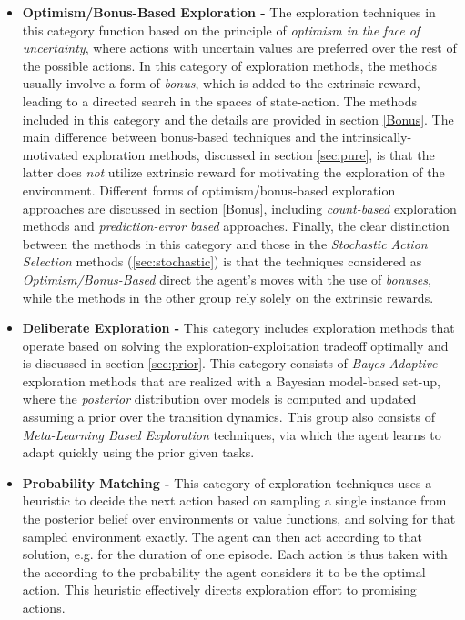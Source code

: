 \begin{itemize}
	\item \textbf{Optimism/Bonus-Based Exploration -} The exploration techniques in this category function based on the principle of \emph{optimism in the face of uncertainty}, where actions with uncertain values are preferred over the rest of the possible actions. In this category of exploration methods, the methods usually involve a form of \emph{bonus}, which is added to the extrinsic reward, leading to a directed search in the spaces of state-action. The methods included in this category and the details are provided in section \ref{Bonus}. The main difference between bonus-based techniques and the intrinsically-motivated exploration methods, discussed in section \ref{sec:pure}, is that the latter does \emph{not} utilize extrinsic reward for motivating the exploration of the environment. Different forms of optimism/bonus-based exploration approaches are discussed in section \ref{Bonus}, including \emph{count-based} exploration methods and \emph{prediction-error based} approaches. Finally, the clear distinction between the methods in this category and those in the \emph{Stochastic Action Selection} methods (\ref{sec:stochastic}) is that the techniques considered as \emph{Optimism/Bonus-Based} direct the agent's moves with the use of \emph{bonuses}, while the methods in the other group rely solely on the extrinsic rewards.
	\item \textbf{Deliberate Exploration -} This category includes exploration methods that operate based on solving the exploration-exploitation tradeoff optimally and is discussed in section \ref{sec:prior}. This category consists of \emph{Bayes-Adaptive} exploration methods that are realized with a Bayesian model-based set-up, where the \emph{posterior} distribution over models is computed and updated assuming a prior over the transition dynamics. This group also consists of \emph{Meta-Learning Based Exploration} techniques, via which the agent learns to adapt quickly using the prior given tasks.
	\item \textbf{Probability Matching -} 
	This category of exploration techniques 
	uses a heuristic to decide the next action based on sampling a single instance from the posterior belief over environments or value functions, and solving for that sampled environment exactly. The agent can then act according to that solution, e.g. for the duration of one episode. Each action is thus taken with the according to the probability the agent considers it to be the optimal action. This heuristic effectively directs exploration effort to promising actions.
\end{itemize}
